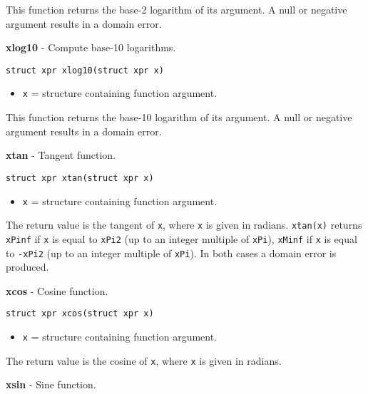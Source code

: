 \documentclass{article}
\begin{document}
This function returns the base-2 logarithm of
its argument. A null or negative argument results in a
domain error.


\hrulefill{}

\textbf{xlog10} - Compute base-10 logarithms.

\begin{verbatim}
struct xpr xlog10(struct xpr x)
\end{verbatim}

\begin{itemize}
\item \texttt{x} = structure containing function argument.
\end{itemize}

This function returns the base-10 logarithm of
its argument. A null or negative argument results in a
domain error.


\hrulefill{}

\textbf{xtan} - Tangent function.

\begin{verbatim}
struct xpr xtan(struct xpr x)
\end{verbatim}

\begin{itemize}
\item \texttt{x} = structure containing function argument.
\end{itemize}

The return value is the tangent of \texttt{x}, where \texttt{x} is
given in radians.
\texttt{xtan(x)} returns \texttt{xPinf} if \texttt{x} is equal to \texttt{xPi2}
(up to an integer multiple of \texttt{xPi}),
\texttt{xMinf} if \texttt{x} is equal to \texttt{-xPi2} (up to an
integer multiple of \texttt{xPi}). In both cases a
domain error is produced.


\hrulefill{}

\textbf{xcos} - Cosine function.

\begin{verbatim}
struct xpr xcos(struct xpr x)
\end{verbatim}

\begin{itemize}
\item \texttt{x} = structure containing function argument.
\end{itemize}

The return value is the cosine of \texttt{x}, where \texttt{x} is
given in radians.


\hrulefill{}

\textbf{xsin} - Sine function.
\end{document}
